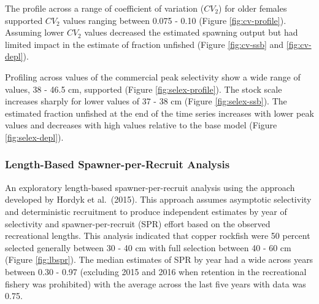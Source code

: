 \documentclass[11pt,
  english,
  a4paper,
]{article}
\begin{document}
\leavevmode\tagmcend\tagstructend\par


The profile across a range of coefficient of variation ({\(CV_2\)\leavevmode\tagmcend\tagstructend}) for older females supported {\(CV_2\)\leavevmode\tagmcend\tagstructend} values ranging between 0.075 - 0.10 (Figure \ref{fig:cv-profile}). Assuming lower {\(CV_2\)\leavevmode\tagmcend\tagstructend} values decreased the estimated spawning output but had limited impact in the estimate of fraction unfished (Figure \ref{fig:cv-ssb} and \ref{fig:cv-depl}).

\leavevmode\tagmcend\tagstructend\par


Profiling across values of the commercial peak selectivity show a wide range of values, 38 - 46.5 cm, supported (Figure \ref{fig:selex-profile}). The stock scale increases sharply for lower values of 37 - 38 cm (Figure \ref{fig:selex-ssb}). The estimated fraction unfished at the end of the time series increases with lower peak values and decreases with high values relative to the base model (Figure \ref{fig:selex-depl}).

\leavevmode\tagmcend\tagstructend\par


\hypertarget{length-based-spawner-per-recruit-analysis}{%
\subsubsection{Length-Based Spawner-per-Recruit Analysis}\label{length-based-spawner-per-recruit-analysis}}

\leavevmode\tagmcend\tagstructend


An exploratory length-based spawner-per-recruit analysis using the approach developed by Hordyk et al.~{(2015)\leavevmode\tagmcend\tagstructend}. This approach assumes asymptotic selectivity and deterministic recruitment to produce independent estimates by year of selectivity and spawner-per-recruit (SPR) effort based on the observed recreational lengths. This analysis indicated that copper rockfish were 50 percent selected generally between 30 - 40 cm with full selection between 40 - 60 cm (Figure \ref{fig:lbspr}). The median estimates of SPR by year had a wide across years between 0.30 - 0.97 (excluding 2015 and 2016 when retention in the recreational fishery was prohibited) with the average across the last five years with data was 0.75.
\end{document}
